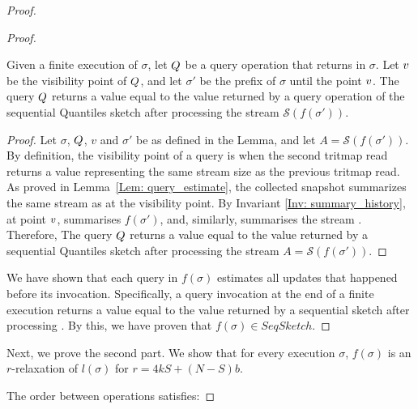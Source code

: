 \begin{proof}
\begin{proof}
\begin{lemma} \label{Lem: query_correctness}
Given a finite execution of \mysketch $\sigma$, let $\mathnormal{Q}$ be a query operation that returns in $\sigma$. Let $\mathnormal{v}$ be the visibility point of $\mathnormal{Q}$, and let $\sigma'$ be the prefix of $\sigma$ until the point $\mathnormal{v}$. The query $\mathnormal{Q}$ returns a value equal to the value returned by a query operation of the sequential Quantiles sketch after processing the stream $\mathcal{S}\left(f(\sigma')\right)$.

\end{lemma}
\begin{proof}
Let $\sigma$, $\mathnormal{Q}$, $v$ and $\sigma'$ be as defined in the Lemma,
and let \(A=\mathcal{S}(f(\sigma'))\).
By definition, the visibility point of a query is when the second tritmap read returns a value representing the same stream size as the previous tritmap read. As proved in Lemma~\ref{Lem: query_estimate}, the collected snapshot summarizes the same stream as \mysketch at the visibility point. By Invariant \ref{Inv: summary_history}, at point $\mathnormal{v}$, \mysketch summarises $f(\sigma')$, and, similarly, summarises the stream \A. 
Therefore, The query $\mathnormal{Q}$ returns a value equal to the value returned by a sequential Quantiles sketch after processing the stream \(A=\mathcal{S}(f(\sigma'))\).
\end{proof}

We have shown that each query in $f(\sigma)$ estimates all updates that happened before its invocation. Specifically, a query invocation at the end of a finite execution \s
returns a value equal to the value returned by a sequential sketch after processing
\A. By this, we have proven that $ f(\sigma) \in SeqSketch$.
\end{proof}

Next, we prove the second part. We show that for every execution $\sigma$, $f(\sigma)$  is an \(r\)-relaxation of \(l(\sigma)\) for \(r = 4kS + (N-S)b\).

The order between operations satisfies:


\end{proof}
